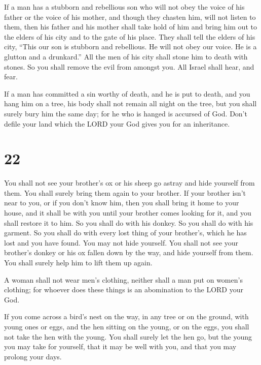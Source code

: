  If a man has a stubborn and rebellious son who will not
obey the voice of his father or the voice of his mother, and though they
chasten him, will not listen to them,  then his father and
his mother shall take hold of him and bring him out to the elders of his
city and to the gate of his place.  They shall tell the
elders of his city, ``This our son is stubborn and rebellious. He will
not obey our voice. He is a glutton and a drunkard.''  All
the men of his city shall stone him to death with stones. So you shall
remove the evil from amongst you. All Israel shall hear, and fear.

 If a man has committed a sin worthy of death, and he is
put to death, and you hang him on a tree,  his body shall
not remain all night on the tree, but you shall surely bury him the same
day; for he who is hanged is accursed of God. Don't defile your land
which the LORD your God gives you for an inheritance.

\hypertarget{section-21}{%
\section{22}\label{section-21}}

 You shall not see your brother's ox or his sheep go astray
and hide yourself from them. You shall surely bring them again to your
brother.  If your brother isn't near to you, or if you don't
know him, then you shall bring it home to your house, and it shall be
with you until your brother comes looking for it, and you shall restore
it to him.  So you shall do with his donkey. So you shall do
with his garment. So you shall do with every lost thing of your
brother's, which he has lost and you have found. You may not hide
yourself.  You shall not see your brother's donkey or his ox
fallen down by the way, and hide yourself from them. You shall surely
help him to lift them up again.

 A woman shall not wear men's clothing, neither shall a man
put on women's clothing; for whoever does these things is an abomination
to the LORD your God.

 If you come across a bird's nest on the way, in any tree or
on the ground, with young ones or eggs, and the hen sitting on the
young, or on the eggs, you shall not take the hen with the young.
 You shall surely let the hen go, but the young you may take
for yourself, that it may be well with you, and that you may prolong
your days.

